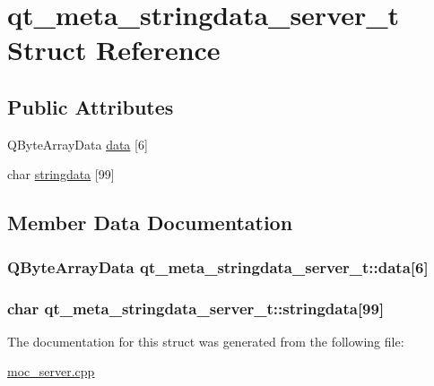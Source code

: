 \hypertarget{structqt__meta__stringdata__server__t}{\section{qt\-\_\-meta\-\_\-stringdata\-\_\-server\-\_\-t Struct Reference}
\label{structqt__meta__stringdata__server__t}
}
\subsection*{Public Attributes}
\begin{DoxyCompactItemize}
\item 
Q\-Byte\-Array\-Data \hyperlink{structqt__meta__stringdata__server__t_a61ab5e52e9731fc84706570d2e539abb}{data} \mbox{[}6\mbox{]}
\item 
char \hyperlink{structqt__meta__stringdata__server__t_abff78ea644f3ba7bfc2878d2b771094c}{stringdata} \mbox{[}99\mbox{]}
\end{DoxyCompactItemize}


\subsection{Member Data Documentation}
\hypertarget{structqt__meta__stringdata__server__t_a61ab5e52e9731fc84706570d2e539abb}{
\subsubsection[{data}]{\setlength{\rightskip}{0pt plus 5cm}Q\-Byte\-Array\-Data qt\-\_\-meta\-\_\-stringdata\-\_\-server\-\_\-t\-::data\mbox{[}6\mbox{]}}}\label{structqt__meta__stringdata__server__t_a61ab5e52e9731fc84706570d2e539abb}
\hypertarget{structqt__meta__stringdata__server__t_abff78ea644f3ba7bfc2878d2b771094c}{
\subsubsection[{stringdata}]{\setlength{\rightskip}{0pt plus 5cm}char qt\-\_\-meta\-\_\-stringdata\-\_\-server\-\_\-t\-::stringdata\mbox{[}99\mbox{]}}}\label{structqt__meta__stringdata__server__t_abff78ea644f3ba7bfc2878d2b771094c}


The documentation for this struct was generated from the following file\-:\begin{DoxyCompactItemize}
\item 
\hyperlink{moc__server_8cpp}{moc\-\_\-server.\-cpp}\end{DoxyCompactItemize}
